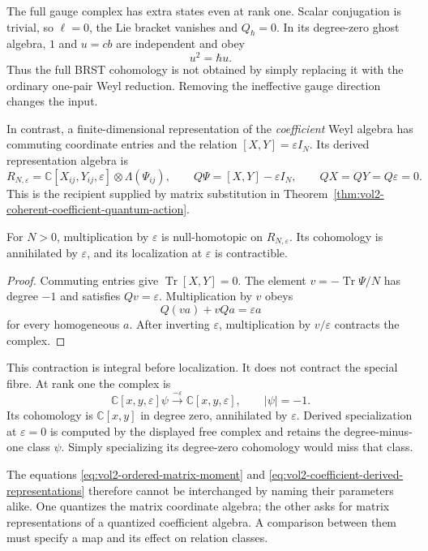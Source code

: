 The full gauge complex has extra states even at rank one.
Scalar conjugation is trivial, so $\ell=0$, the Lie bracket
vanishes and $Q_\hbar=0$. In its degree-zero ghost algebra,
$1$ and $u=cb$ are independent and obey
\[
 u^2=\hbar u.
\]
Thus the full BRST cohomology is not obtained by simply
replacing it with the ordinary one-pair Weyl reduction.
Removing the ineffective gauge direction changes the input.

In contrast, a finite-dimensional representation of the
\emph{coefficient} Weyl algebra has commuting coordinate
entries and the relation $[X,Y]=\varepsilon I_N$.
Its derived representation algebra is
\begin{equation}\label{eq:vol2-coefficient-derived-representations}
 R_{N,\varepsilon}
   =\mathbb C[X_{ij},Y_{ij},\varepsilon]\otimes\Lambda(\Psi_{ij}),
 \qquad Q\Psi=[X,Y]-\varepsilon I_N,
 \qquad QX=QY=Q\varepsilon=0.
\end{equation}
This is the recipient supplied by matrix substitution in
Theorem~\ref{thm:vol2-coherent-coefficient-quantum-action}.

\begin{proposition}\label{prop:vol2-finite-weyl-representations}
For $N>0$, multiplication by $\varepsilon$ is null-homotopic
on $R_{N,\varepsilon}$. Its cohomology is annihilated by
$\varepsilon$, and its localization at $\varepsilon$ is
contractible.
\end{proposition}
\begin{proof}
Commuting entries give $\operatorname{Tr}[X,Y]=0$.
The element $v=-\operatorname{Tr}\Psi/N$ has degree $-1$
and satisfies $Qv=\varepsilon$. Multiplication by $v$ obeys
\[
 Q(va)+vQa=\varepsilon a
\]
for every homogeneous $a$. After inverting $\varepsilon$,
multiplication by $v/\varepsilon$ contracts the complex.
\end{proof}

This contraction is integral before localization. It does not
contract the special fibre. At rank one the complex is
\[
 \mathbb C[x,y,\varepsilon]\psi
     \xrightarrow{-\varepsilon}
 \mathbb C[x,y,\varepsilon],\qquad |\psi|=-1.
\]
Its cohomology is $\mathbb C[x,y]$ in degree zero, annihilated
by $\varepsilon$. Derived specialization at $\varepsilon=0$
is computed by the displayed free complex and retains the
degree-minus-one class $\psi$. Simply specializing its
degree-zero cohomology would miss that class.

The equations \eqref{eq:vol2-ordered-matrix-moment} and
\eqref{eq:vol2-coefficient-derived-representations} therefore
cannot be interchanged by naming their parameters alike.
One quantizes the matrix coordinate algebra; the other asks
for matrix representations of a quantized coefficient algebra.
A comparison between them must specify a map and its effect
on relation classes.

